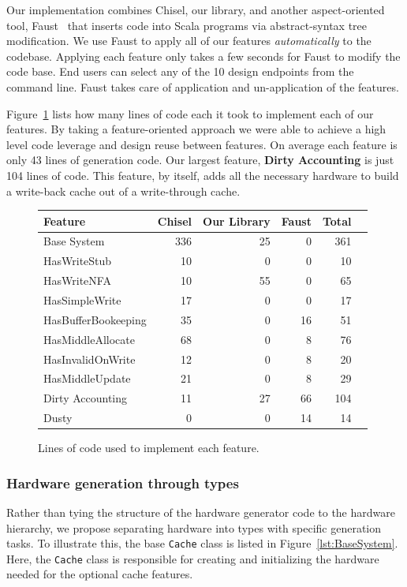 \documentclass[conference]{IEEEtran}
\begin{document}
Our implementation combines Chisel, our library, and another aspect-oriented tool, Faust~\cite{Deters:21} that inserts code into Scala programs via abstract-syntax tree modification. We use Faust to apply all of our features \emph{automatically} to the \Riscvmini{} codebase. Applying each feature only takes a few seconds for Faust to modify the code base. End users can select any of the 10 design endpoints from the command line. Faust takes care of application and un-application of the features.

Figure~\ref{fig:LOC} lists how many lines of code each it took to implement each of our features. By taking a feature-oriented approach we were able to achieve a high level code leverage and design reuse between features. On average each feature is only 43 lines of generation code. Our largest feature, \textbf{Dirty Accounting} is just 104 lines of code. This feature, by itself, adds all the necessary hardware to build a write-back cache out of a write-through cache.

\begin{figure}[ht]
    \centering
\scriptsize
\begin{tabular}{lrrrrr}\toprule
Feature &Chisel &Our Library &Faust &Total \\\midrule
Base System &336 &25 &0 &361 \\
HasWriteStub &10 &0 &0 &10 \\
HasWriteNFA &10 &55 &0 &65 \\
HasSimpleWrite &17 &0 &0 &17 \\
HasBufferBookeeping &35 &0 &16 &51 \\
HasMiddleAllocate &68 &0 &8 &76 \\
HasInvalidOnWrite &12 &0 &8 &20 \\
HasMiddleUpdate &21 &0 &8 &29 \\
Dirty Accounting &11 &27 &66 &104 \\
Dusty &0 &0 &14 &14 \\
\bottomrule
\end{tabular}
    \caption{Lines of code used to implement each feature.}
    \label{fig:LOC}
\end{figure}

\subsubsection{Hardware generation through types}\label{sec:types}
Rather than tying the structure of the hardware generator code to the hardware hierarchy, we propose separating hardware into types with specific generation tasks. To illustrate this, the base \texttt{Cache} class is listed in Figure~\ref{lst:BaseSystem}. Here, the \texttt{Cache} class is responsible for creating and initializing the hardware needed for the optional cache features. 
\end{document}

